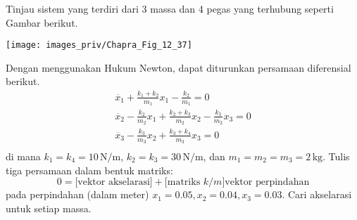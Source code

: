 \begin{soal}

Tinjau sistem yang terdiri dari 3 massa dan 4 pegas yang terhubung
seperti Gambar berikut.

{\centering
\texttt{[image: images\_priv/Chapra\_Fig\_12\_37]}
\par}

Dengan menggunakan Hukum Newton, dapat diturunkan persamaan diferensial
berikut.
\begin{align*}
\ddot{x_{1}} + \frac{k_1 + k_2}{m_1} x_{1} - \frac{k_2}{m_1} = 0 \\
\ddot{x_{2}} - \frac{k_2}{m_2}x_1 + \frac{k_2 + k_3}{m_2}x_2 - \frac{k_3}{m_2}x_3 = 0 \\
\ddot{x_{3}} - \frac{k_3}{m_3}x_2 + \frac{k_3 + k_4}{m_3}x_3 = 0\\
\end{align*}
di mana $k_1 = k_4 = 10\,\mathrm{N/m}$, $k_2 = k_3 = 30\,\mathrm{N/m}$,
dan $m_1 = m_2 = m_3 = 2\,\mathrm{kg}$. Tulis tiga persamaan dalam bentuk matriks:
\begin{equation*}
0 = \text{[vektor akselarasi]} + \text{[matriks }k/m\text{]}\text{vektor perpindahan}
\end{equation*}
pada perpindahan (dalam meter) $x_{1} = 0.05, x_{2} = 0.04, x_{3} = 0.03$.
Cari akselarasi untuk setiap massa.
\end{soal}